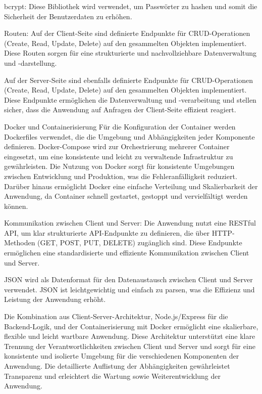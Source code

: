 bcrypt: Diese Bibliothek wird verwendet, um Passwörter zu hashen und somit die Sicherheit der Benutzerdaten zu erhöhen.

Routen:
Auf der Client-Seite sind definierte Endpunkte für CRUD-Operationen (Create, Read, Update, Delete) auf den gesammelten Objekten implementiert.
Diese Routen sorgen für eine strukturierte und nachvollziehbare Datenverwaltung und -darstellung.

Auf der Server-Seite sind ebenfalls definierte Endpunkte für CRUD-Operationen (Create, Read, Update, Delete) auf den gesammelten Objekten implementiert.
Diese Endpunkte ermöglichen die Datenverwaltung und -verarbeitung und stellen sicher, dass die Anwendung auf Anfragen der Client-Seite effizient reagiert.

Docker und Containerisierung
Für die Konfiguration der Container werden Dockerfiles verwendet, die die Umgebung und Abhängigkeiten jeder Komponente definieren.
Docker-Compose wird zur Orchestrierung mehrerer Container eingesetzt, um eine konsistente und leicht zu verwaltende Infrastruktur zu gewährleisten.
Die Nutzung von Docker sorgt für konsistente Umgebungen zwischen Entwicklung und Produktion, was die Fehleranfälligkeit reduziert.
Darüber hinaus ermöglicht Docker eine einfache Verteilung und Skalierbarkeit der Anwendung, da Container schnell gestartet, gestoppt und vervielfältigt werden können.

Kommunikation zwischen Client und Server:
Die Anwendung nutzt eine RESTful API, um klar strukturierte API-Endpunkte zu definieren, die über HTTP-Methoden (GET, POST, PUT, DELETE) zugänglich sind.
Diese Endpunkte ermöglichen eine standardisierte und effiziente Kommunikation zwischen Client und Server.

JSON wird als Datenformat für den Datenaustausch zwischen Client und Server verwendet.
JSON ist leichtgewichtig und einfach zu parsen, was die Effizienz und Leistung der Anwendung erhöht.

Die Kombination aus Client-Server-Architektur, Node.js/Express für die Backend-Logik, und der Containerisierung mit Docker ermöglicht eine skalierbare, flexible und leicht wartbare Anwendung.
Diese Architektur unterstützt eine klare Trennung der Verantwortlichkeiten zwischen Client und Server und sorgt für eine konsistente und isolierte Umgebung für die verschiedenen Komponenten der Anwendung.
Die detaillierte Auflistung der Abhängigkeiten gewährleistet Transparenz und erleichtert die Wartung sowie Weiterentwicklung der Anwendung.
